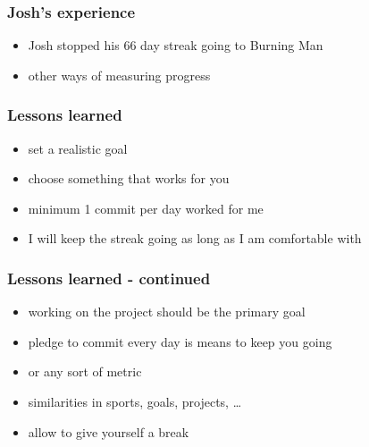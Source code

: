 \documentclass[14pt]{beamer}
\begin{document}
  \begin{frame}
    \frametitle{Josh's experience}
    \begin{itemize}
      \item Josh stopped his 66 day streak going to Burning Man
      \item other ways of measuring progress
    \end{itemize}
  \end{frame}
  \begin{frame}
    \frametitle{Lessons learned}
    \begin{itemize}
      \item set a realistic goal
      \item choose something that works for you
      \item minimum 1 commit per day worked for me
      \item I will keep the streak going as long as I am comfortable with
    \end{itemize}
  \end{frame}
  \begin{frame}
    \frametitle{Lessons learned - continued}
    \begin{itemize}
      \item working on the project should be the primary goal
      \item pledge to commit every day is means to keep you going
      \item or any sort of metric
      \item similarities in sports, goals, projects, \ldots
      \item allow to give yourself a break
    \end{itemize}
  \end{frame}
\end{document}
